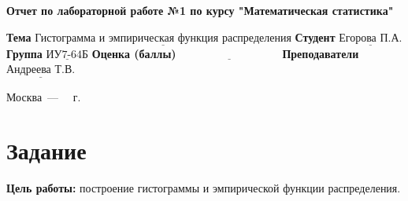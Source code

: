 \documentclass[12pt]{report}
\begin{document}
\begin{titlepage}
  \begin{center}
        \Large\textbf{Отчет по лабораторной работе №1 по курсу "Математическая статистика"}
    \end{center}
	
	\noindent\textbf{Тема} $\underline{\text{Гистограмма и эмпирическая функция распределения}}$\newline\newline
	\noindent\textbf{Студент} $\underline{\text{Егорова П.А.}}$\newline\newline
	\noindent\textbf{Группа} $\underline{\text{ИУ7-64Б}}$\newline\newline
	\noindent\textbf{Оценка (баллы)} $\underline{\text{~~~~~~~~~~~~~~~~~~~~~~~~~~~}}$\newline\newline
	\noindent\textbf{Преподаватели} $\underline{\text{Андреева Т.В.}}$\newline\newline\newline
	
	\begin{center}
		\vfill
		Москва~---~\the\year
		~г.
	\end{center}
\end{titlepage}

\renewcommand{\thefigure}{\thesection.\arabic{figure}} 
\renewcommand{\thetable}{\thesection.\arabic{table}} 
\renewcommand{\thelstlisting}{\thesection.\arabic{lstlisting}} 


\renewcommand*\thesection{\arabic{section}}


\section{Задание}

\textbf{Цель работы:} построение гистограммы и эмпирической функции распределения.
\end{document}
